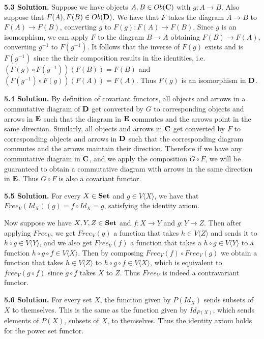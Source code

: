 \textbf{5.3 Solution.} Suppose we have objects $A, B \in Ob(\bf{C})$ with $g: A \to B$. Also suppose that $F(A), F(B) \in Ob(\bf{D})$. We have that $F$ takes the diagram $A \to B$ to $F(A) \to F(B)$, converting $g$ to $F(g): F(A) \to F(B)$. Since $g$ is an isomorphism, we can apply $F$ to the diagram $B \to A$ obtaining $F(B) \to F(A)$, converting $g^{-1}$ to $F(g^{-1})$. It follows that the inverse of $F(g)$ exists and is $F(g^{-1})$ since the their composition results in the identities, i.e. $(F(g) \circ F(g^{-1}))(F(B)) = F(B)$ and $(F(g^{-1}) \circ F(g))(F(A)) = F(A)$. Thus $F(g)$ is an isomorphism in $\bf{D}$.

\textbf{5.4 Solution.} By definition of covariant functors, all objects and arrows in a commutative diagram of $\bf{D}$ get converted by $G$ to corresponding objects and arrows in $\bf{E}$ such that the diagram in $\bf{E}$ commutes and the arrows point in the same direction. Similarly, all objects and arrows in $\bf{C}$ get converted by $F$ to corresponding objects and arrows in $\bf{D}$ such that the corresponding diagram commutes and the arrows maintain their direction. Therefore if we have any commutative diagram in $\bf{C}$, and we apply the composition $G \circ F$, we will be guaranteed to obtain a commutative diagram with arrows in the same direction in $\bf{E}$. Thus $G \circ F$ is also a covariant functor.

\textbf{5.5 Solution.} For every $X \in \bf{Set}$ and $g \in V \langle X \rangle$, we have that $Free_V(Id_X)(g) = f \circ Id_X = g$, satisfying the identity axiom.

Now suppose we have $X, Y, Z \in \bf{Set}$ and $f: X \to Y$ and $g: Y \to Z$. Then after applying $Free_V$, we get $Free_V(g)$ a function that takes $h \in V \langle Z \rangle$ and sends it to $h \circ g \in V \langle Y \rangle$, and we also get $Free_V(f)$ a function that takes a $h \circ g \in V \langle Y \rangle$ to a function $h \circ g \circ f \in V \langle X \rangle$. Then by composing $Free_V(f) \circ Free_V(g)$ we obtain a function that takes $h \in V \langle Z \rangle$ to $h \circ g \circ f \in V \langle X \rangle$, which is equivalent to $free_V(g \circ f)$ since $g \circ f$ takes $X$ to $Z$. Thus $Free_V$ is indeed a contravariant functor.

\textbf{5.6 Solution.} For every set $X$, the function given by $P(Id_X)$ sends subsets of $X$ to themselves. This is the same as the function given by $Id_{P(X)}$, which sends elements of $P(X)$, subsets of $X$, to themselves. Thus the identity axiom holds for the power set functor.

